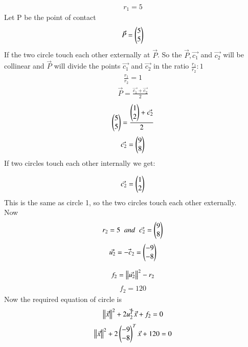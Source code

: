 \documentclass[journal]{IEEEtran}
\theoremstyle{remark}
\begin{document}
\begin{align}
  r_1=5
\end{align}
Let P be the point of contact
\begin{align}
    \Vec{P}=\begin{pmatrix}5\\5\end{pmatrix}
\end{align}
If the two circle touch each other externally at $\Vec{P}$. So the $\Vec{P},\Vec{c_1}$ and $\Vec{c_2}$ will be collinear and $\Vec{P}$ will divide the points $\Vec{c_1}$ and $\Vec{c_2}$ in the ratio $\frac{r_1}{r_2}:1$
\begin{align}
   \frac{r_1}{r_2}=1
\end{align}
\begin{align}
   \Vec{P}=\frac{\Vec{c_1}+\Vec{c_2}}{2}
\end{align}
\begin{align}
    \begin{pmatrix}5\\5\end{pmatrix}=\frac{\begin{pmatrix}1\\2\end{pmatrix}+\Vec{c_2}}{2}
\end{align}
\begin{align}
\Vec{c_2}=\begin{pmatrix}9\\8\end{pmatrix}
  \end{align}
If two circles touch each other internally we get:

\begin{align}
 \Vec{c_2}=\begin{pmatrix}1\\2\end{pmatrix}
\end{align}
This is the same as circle 1, so the two circles touch each other externally.\\
Now
\begin{align}
    r_2=5\;\;and\;\;\Vec{c_2}=\begin{pmatrix}9\\8\end{pmatrix}
\end{align}
\begin{align}
\Vec{u_2}=\Vec{-c_2}=\begin{pmatrix}-9\\-8\end{pmatrix}
\end{align}

\begin{align}
    f_2=\left\lVert\Vec{u_2}\right\rVert^2-r_2
\end{align}
\begin{align}
   f_2=120
\end{align}
Now the required equation of circle is
\begin{align}
   \left\lVert\Vec{x}\right\rVert^2+2\Vec{u_2^T}\Vec{x}+f_2=0
\end{align}
\begin{align}
    \left\lVert\Vec{x}\right\rVert^2+2\begin{pmatrix}-9\\-8\end{pmatrix}^T\Vec{x}+120=0
\end{align}
\end{document}
